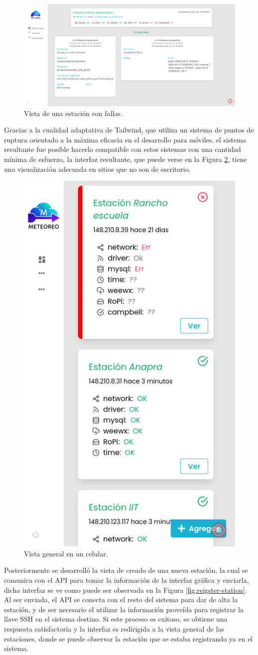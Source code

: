 \begin{figure}[!ht]
	\centering
	\includegraphics[width=1\linewidth]{images/screenshots/0.1.0-station_failed.png}
	\caption{Vista de una estación con fallas.}
	\label{fig:station-failed}
\end{figure}

Gracias a la cualidad adaptativa de Tailwind, que utiliza un sistema de puntos de ruptura orientado a la máxima eficacia en el desarrollo para móviles, el sistema resultante fue posible hacerlo compatible con estos sistemas con una cantidad mínima de esfuerzo, la interfaz resultante, que puede verse en la Figura \ref{fig:dashboard-responsive}, tiene una visualización adecuada en sitios que no son de escritorio.

\begin{figure}[!ht]
	\centering
	\includegraphics[width=0.37\linewidth]{images/screenshots/0.0.1-dashboard-responsive.png}
	\caption{Vista general en un celular.}
	\label{fig:dashboard-responsive}
\end{figure}

Posteriormente se desarrolló la vista de creado de una nueva estación, la cual se comunica con el API para tomar la información de la interfaz gráfica y enviarla, dicha interfaz se ve como puede ser observada en la Figura \ref{fig:reigster-station}. Al ser enviada, el API se conecta con el resto del sistema para dar de alta la estación, y de ser necesario el utilizar la información proveída para registrar la llave SSH en el sistema destino. Si este proceso es exitoso, se obtiene una respuesta satisfactoria y la interfaz es redirigida a la vista general de las estaciones, donde se puede observar la estación que se estaba registrando ya en el sistema.


